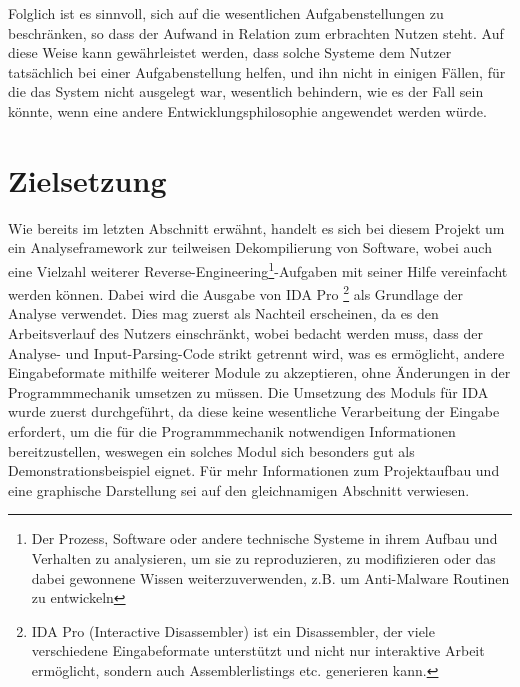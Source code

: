 \documentclass[11pt]{article}
\begin{document}
Folglich ist es sinnvoll, sich auf die wesentlichen Aufgabenstellungen zu beschränken, so dass
der Aufwand in Relation zum erbrachten Nutzen steht. Auf diese Weise kann gewährleistet werden, dass
solche Systeme dem Nutzer tatsächlich bei einer Aufgabenstellung helfen, und ihn nicht in einigen Fällen,
für die das System nicht ausgelegt war, wesentlich behindern, wie es der Fall sein könnte, wenn eine
andere Entwicklungsphilosophie angewendet werden würde.

\section{Zielsetzung} Wie bereits im letzten Abschnitt erwähnt, handelt es sich bei diesem Projekt
um ein Analyseframework zur teilweisen Dekompilierung von Software, wobei auch eine Vielzahl
weiterer Reverse-Engineering\footnote{Der Prozess, Software oder andere technische Systeme in ihrem
Aufbau und Verhalten zu analysieren, um sie zu reproduzieren, zu modifizieren oder das dabei
gewonnene Wissen weiterzuverwenden, z.B. um Anti-Malware Routinen zu entwickeln}-Aufgaben mit seiner
Hilfe vereinfacht werden können. Dabei wird die Ausgabe von IDA Pro
\footnote{IDA Pro (Interactive Disassembler)
	ist ein Disassembler, der
	viele verschiedene Eingabeformate unterstützt und nicht nur interaktive Arbeit ermöglicht, sondern
	auch Assemblerlistings etc. generieren kann.}
als Grundlage der Analyse verwendet. Dies mag zuerst
als Nachteil erscheinen, da es den Arbeitsverlauf des Nutzers einschränkt, wobei bedacht werden
muss, dass der Analyse- und Input-Parsing-Code strikt getrennt wird, was es ermöglicht, andere
Eingabeformate mithilfe weiterer Module zu akzeptieren, ohne Änderungen in der Programmmechanik
umsetzen zu müssen. Die Umsetzung des Moduls für IDA wurde zuerst durchgeführt, da diese keine
wesentliche Verarbeitung der Eingabe erfordert, um die für die Programmmechanik notwendigen
Informationen bereitzustellen, weswegen ein solches Modul sich besonders gut als
Demonstrationsbeispiel eignet. Für mehr Informationen zum Projektaufbau und eine graphische
Darstellung sei auf den gleichnamigen Abschnitt verwiesen.
\end{document}
